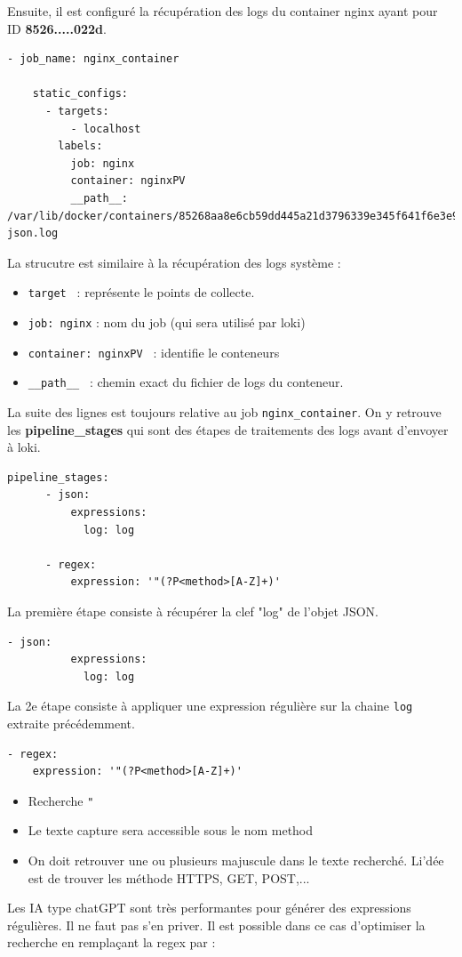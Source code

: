 \documentclass[french, 12pt]{article}%
\newcommand{\itemE}{\item[$\bullet$]}
\begin{document}
Ensuite, il est configuré la récupération des logs du container nginx  ayant pour ID \textbf{8526.....022d}. 
\begin{lstlisting}[style=commande]
- job_name: nginx_container

    static_configs:
      - targets:
          - localhost
        labels:
          job: nginx
          container: nginxPV
          __path__: /var/lib/docker/containers/85268aa8e6cb59dd445a21d3796339e345f641f6e3e91b7606b7d495c342022d/85268aa8e6cb59dd445a21d3796339e345f641f6e3e91b7606b7d495c342022d-json.log
\end{lstlisting}
La strucutre est similaire à la récupération des logs système : 
\begin{itemize}
\itemE \verb?target ? : représente le points de collecte.
\itemE \verb?job: nginx? : nom du job (qui sera utilisé par loki)
\itemE \verb?container: nginxPV ? : identifie le conteneurs 
\itemE \verb?__path__ ? : chemin exact du fichier de logs du conteneur.
\end{itemize}

La suite des lignes est toujours relative au job \verb?nginx_container?. On y retrouve les \textbf{pipeline\_stages} qui sont des étapes de traitements des logs avant d'envoyer à loki. 


\begin{lstlisting}[style=commande]
    pipeline_stages:    
      - json:
          expressions:
            log: log 

      - regex:
          expression: '"(?P<method>[A-Z]+)'

\end{lstlisting}

La première étape consiste à récupérer la clef "log" de l'objet JSON. 
\begin{lstlisting}[style=commande]
      - json:
          expressions:
            log: log 
\end{lstlisting}


La 2e étape consiste à appliquer une expression régulière sur la chaine \verb?log? extraite précédemment. 
\begin{lstlisting}[style=commande]
- regex:
    expression: '"(?P<method>[A-Z]+)'
\end{lstlisting}
\begin{itemize}
\itemE Recherche \verb?"?
\itemE Le texte capture sera accessible sous le nom method
\itemE On doit retrouver une ou plusieurs majuscule dans le texte recherché. Li'dée est de trouver les méthode HTTPS, GET, POST,...
\end{itemize}
Les IA type chatGPT sont très performantes pour générer des expressions régulières. Il ne faut pas s'en priver. Il est possible dans ce cas d'optimiser la recherche en remplaçant la regex par : 
\end{document}
